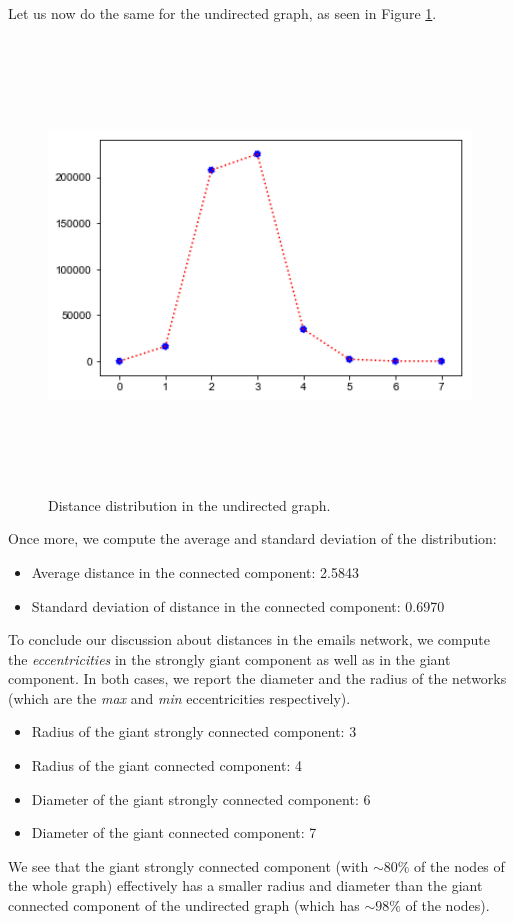 \documentclass{report}
\theoremstyle{definition}
\theoremstyle{remark}
\begin{document}
Let us now do the same for the undirected graph, as seen in Figure \ref{fig:DistDistrUndir}.
\begin{figure} [H]
	\centering
	\centerline{\includegraphics[width = 13cm, height = 12cm, keepaspectratio]{distance_distribution_und.png}}
	\caption{Distance distribution in the undirected graph.} \label{fig:DistDistrUndir}
\end{figure}
Once more, we compute the average and standard deviation of the distribution:
 \begin{itemize}
	\item Average distance in the connected component: 2.5843
	\item Standard deviation of distance in the connected component: 0.6970
\end{itemize}
To conclude our discussion about distances in the emails network, we compute the \textit{eccentricities} in the strongly giant component as well as in the giant component. In both cases, we report the diameter and the radius of the networks (which are the \textit{max} and \textit{min} eccentricities respectively).
\begin{itemize}
	\item Radius of the giant strongly connected component: 3
	\item Radius of the giant connected component: 4
	\item Diameter of the giant strongly connected component: 6
	\item Diameter of the giant connected component: 7
\end{itemize}
We see that the giant strongly connected component (with $\sim80\%$ of the nodes of the whole graph) effectively has a smaller radius and diameter than the giant connected component of the undirected graph (which has $\sim98\%$ of the nodes).
\end{document}
